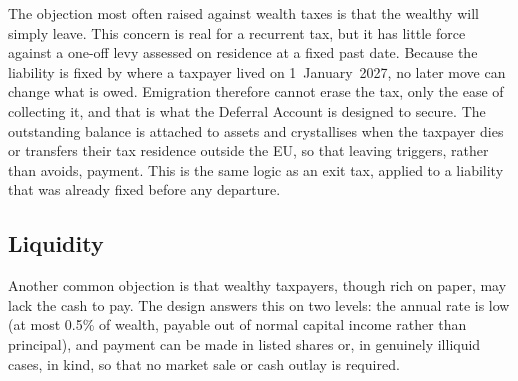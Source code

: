 \documentclass[../../main]{subfiles}
\begin{document}
The objection most often raised against wealth taxes is that the wealthy will simply leave. This concern is real for a recurrent tax, %
but it has little force against a one-off levy assessed on residence at a fixed past date. Because the liability is fixed by where a taxpayer lived on 1~January~2027, no later move can change what is owed. %
Emigration therefore cannot erase the tax, only the ease of collecting it, and that is what the Deferral Account is designed to secure. The outstanding balance is attached to assets and crystallises when the taxpayer dies or transfers their tax residence outside the EU, so that leaving triggers, rather than avoids, payment. This is the same logic as an exit tax, applied to a liability that was already fixed before any departure.


\subsection{Liquidity}

Another common objection is that wealthy taxpayers, though rich on paper, may lack the cash to pay. The design answers this on two levels: the annual rate is low (at most 0.5\% of wealth, payable out of normal capital income rather than principal), and payment can be made in listed shares or, in genuinely illiquid cases, in kind,
so that no market sale or cash outlay is required. %
\end{document}
